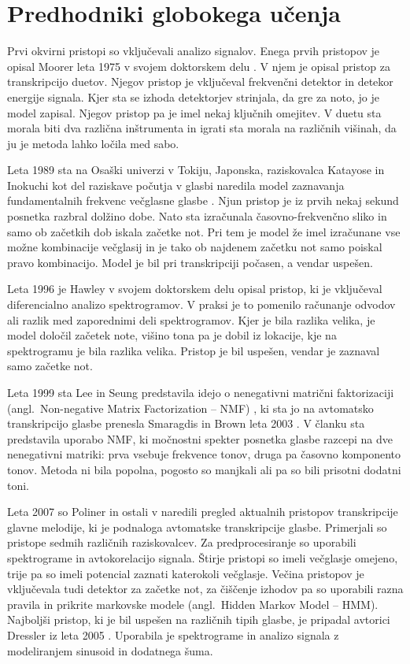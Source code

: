 \documentclass[a4paper, 12pt, openright]{book}
\newcommand{\en}{angl.}
\begin{document}
\section{Predhodniki globokega učenja}

Prvi okvirni pristopi so vključevali analizo signalov.
Enega prvih pristopov je opisal Moorer leta 1975 v svojem doktorskem delu \cite{moorer1975digital}.
V njem je opisal pristop za transkripcijo duetov.
Njegov pristop je vključeval frekvenčni detektor in detekor energije signala.
Kjer sta se izhoda detektorjev strinjala, da gre za noto, jo je model zapisal.
Njegov pristop pa je imel nekaj ključnih omejitev.
V duetu sta morala biti dva različna inštrumenta in igrati sta morala na različnih višinah, da ju je metoda lahko ločila med sabo.

Leta 1989 sta na Osaški univerzi v Tokiju, Japonska, raziskovalca Katayose in Inokuchi kot del raziskave počutja v glasbi naredila model zaznavanja fundamentalnih frekvenc večglasne glasbe \cite{katayose1989kensei}.
Njun pristop je iz prvih nekaj sekund posnetka razbral dolžino dobe.
Nato sta izračunala časovno-frekvenčno sliko in samo ob začetkih dob iskala začetke not.
Pri tem je model že imel izračunane vse možne kombinacije večglasij in je tako ob najdenem začetku not samo poiskal pravo kombinacijo.
Model je bil pri transkripciji počasen, a vendar uspešen.

Leta 1996 je Hawley v svojem doktorskem delu \cite{hawley1993structure} opisal pristop, ki je vključeval diferencialno analizo spektrogramov. V praksi je to pomenilo računanje odvodov ali razlik med zaporednimi deli spektrogramov.
Kjer je bila razlika velika, je model določil začetek note, višino tona pa je dobil iz lokacije, kje na spektrogramu je bila razlika velika.
Pristop je bil uspešen, vendar je zaznaval samo začetke not.

Leta 1999 sta Lee in Seung predstavila idejo o nenegativni matrični faktorizaciji (\en\ Non-negative Matrix Factorization -- NMF) \cite{lee1999learning}, ki sta jo na avtomatsko transkripcijo glasbe prenesla Smaragdis in Brown leta 2003 \cite{smaragdis2003nmf}.
V članku sta predstavila uporabo NMF, ki močnostni spekter posnetka glasbe razcepi na dve nenegativni matriki: prva vsebuje frekvence tonov, druga pa časovno komponento tonov.
Metoda ni bila popolna, pogosto so manjkali ali pa so bili prisotni dodatni toni.

Leta 2007 so Poliner in ostali v \cite{poliner2007melody} naredili pregled aktualnih pristopov transkripcije glavne melodije, ki je podnaloga avtomatske transkripcije glasbe.
Primerjali so pristope sedmih različnih raziskovalcev.
Za predprocesiranje so uporabili spektrograme in avtokorelacijo signala. Štirje pristopi so imeli večglasje omejeno, trije pa so imeli potencial zaznati katerokoli večglasje.
Večina pristopov je vključevala tudi detektor za začetke not, za čiščenje izhodov pa so uporabili razna pravila in prikrite markovske modele (\en\ Hidden Markov Model -- HMM).
Najboljši pristop, ki je bil uspešen na različnih tipih glasbe, je pripadal avtorici Dressler iz leta 2005 \cite{dressler2005extraction}. Uporabila je spektrograme in analizo signala z modeliranjem sinusoid in dodatnega šuma.
\end{document}
